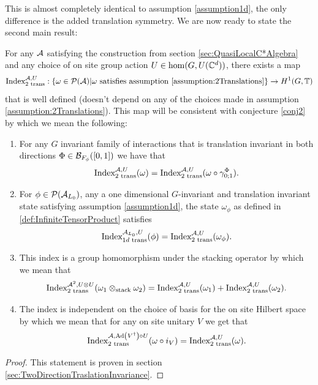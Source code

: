 \documentclass[12pt,a4paper,twoside]{article}
\numberwithin{equation}{section}
\begin{document}
This is almost completely identical to assumption \ref{assumption1d}, the only difference is the added translation symmetry. We are now ready to state the second main result:
\begin{theorem}\label{thrm:ExistenceSecondIndex}
	For any $\AA$ satisfying the construction from section \ref{sec:QuasiLocalC*Algebra} and any choice of on site group action $U\in\hom(G,U(\CC^d))$, there exists a map
	\begin{equation}
		\textrm{Index}^{\AA,U}_{2\text{ trans}}:\{\omega\in\PP(\AA)| \omega\text{ satisfies assumption \ref{assumption:2Translations}}\}\rightarrow H^1(G,\TT)
	\end{equation}
	that is well defined (doesn't depend on any of the choices made in assumption \ref{assumption:2Translations}). This map will be consistent with conjecture \ref{conj2} by which we mean the following:
	\begin{enumerate}
		\item For any $G$ invariant family of interactions that is translation invariant in both directions $\Phi\in\BB_{F_\phi}([0,1])$ we have that
		\begin{equation}
			\textrm{Index}^{\AA,U}_{2\text{ trans}}(\omega)=\textrm{Index}^{\AA,U}_{2\text{ trans}}(\omega\circ\gamma^\Phi_{0;1}).
		\end{equation}
		\item For $\phi\in\PP(\AA_{L_0})$, any a one dimensional $G$-invariant and translation invariant state satisfying assumption \ref{assumption1d}, the state $\omega_\phi$ as defined in \ref{def:InfiniteTensorProduct} satisfies
		\begin{equation}
			\textrm{Index}^{\AA_{L_0},U}_{1d\text{ trans}}(\phi)=\text{Index}^{\AA,U}_{2\text{ trans}}(\omega_\phi).
		\end{equation}
		\item This index is a group homomorphism under the stacking operator by which we mean that
		\begin{equation}
			\textrm{Index}_{\text{2 trans}}^{\AA^2,U\otimes U}(\omega_1\otimes_{\text{stack}}\omega_2)=\textrm{Index}_{\text{2 trans}}^{\AA,U}(\omega_1)+\textrm{Index}_{\text{2 trans}}^{\AA,U}(\omega_2).
		\end{equation}
		\item The index is independent on the choice of basis for the on site Hilbert space by which we mean that for any on site unitary $V$ we get that
		\begin{equation}
			\textrm{Index}^{\AA,\Ad{V^\dagger}\circ U}_{\text{2 trans}}(\omega\circ i_V) =\textrm{Index}^{\AA,U}_{\text{2 trans}}(\omega).
		\end{equation}
	\end{enumerate}
\end{theorem}
\begin{proof}
	This statement is proven in section \ref{sec:TwoDirectionTraslationInvariance}.
\end{proof}
\end{document}
